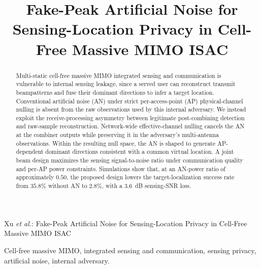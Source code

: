 \documentclass[letterpaper,journal]{IEEEtran}
\begin{document}
\title{Fake-Peak Artificial Noise for Sensing-Location Privacy in Cell-Free Massive MIMO ISAC}

%
{Xu \MakeLowercase{\textit{et al.}}: Fake-Peak Artificial Noise for Sensing-Location Privacy in Cell-Free Massive MIMO ISAC}

\maketitle

\begin{abstract}
Multi-static cell-free massive MIMO integrated sensing and communication is vulnerable to internal sensing leakage, since a served user can reconstruct transmit beampatterns and fuse their dominant directions to infer a target location. Conventional artificial noise (AN) under strict per-access-point (AP) physical-channel nulling is absent from the raw observations used by this internal adversary. We instead exploit the receive-processing asymmetry between legitimate post-combining detection and raw-sample reconstruction. Network-wide effective-channel nulling cancels the AN at the combiner outputs while preserving it in the adversary's multi-antenna observations. Within the resulting null space, the AN is shaped to generate AP-dependent dominant directions consistent with a common virtual location. A joint beam design maximizes the sensing signal-to-noise ratio under communication quality and per-AP power constraints. Simulations show that, at an AN-power ratio of approximately $0.50$, the proposed design lowers the target-localization success rate from $35.8\%$ without AN to $2.8\%$, with a $3.6$~dB sensing-SNR loss.

\end{abstract}

\begin{IEEEkeywords}
Cell-free massive MIMO, integrated sensing and communication, sensing privacy, artificial noise, internal adversary.
\end{IEEEkeywords}
\end{document}

